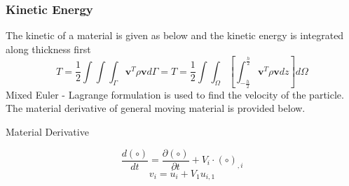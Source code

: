 \documentclass[9pt]{beamer}
\begin{document}
\begin{frame}
\frametitle{Kinetic Energy}
The kinetic of a material is given as below and the kinetic energy is integrated along thickness first
\begin{equation*}
T = \frac{1}{2} \int \int \int_{\Gamma} \mathbf{v}^T\rho\mathbf{v} d\Gamma = 
T = \frac{1}{2} \int \int_\Omega \left[ \int_{-\frac{h}{2}}^{\frac{h}{2}} \mathbf{v}^T\rho\mathbf{v} dz \right] d\Omega
\end{equation*}
Mixed Euler - Lagrange formulation is used to find the velocity of the particle. The material derivative of general moving material is provided below.

\begin{block}{Material Derivative}


\begin{equation*}
\frac{d(\circ)}{dt}=\frac{\partial(\circ)}{\partial t} + V_i \cdot (\circ)_{,i} 
\end{equation*}
\begin{equation*}
  v_i = \dot{u_i}+V_1u_{i,1}
\end{equation*} 

\end{block}
\end{frame}
\end{document}
